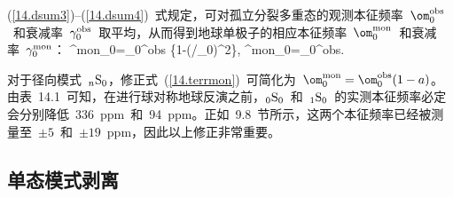 \fi
(\ref{14.dsum3})--(\ref{14.dsum4})~式规定，可对孤立分裂多重态的观测本征频率~$\om^{\rm obs}_0$~和衰减率~$\gamma^{\rm obs}_0$~取平均，从而得到地球单极子的相应本征频率~$\om^{\rm mon}_0$~和衰减率~$\gamma^{\rm mon}_0$：
%
\eq \label{14.terrmon}
\om^{\rm mon}_0=\om_0^{\rm obs}\hspace{-0.2 mm}
\big\{1-
\!(\Omega/\om_0)^2\big\},
\en
\eq
\gamma^{\rm mon}_0=\gamma_0^{\rm obs}.
\en

对于径向模式~${}_n{\rm S}_0$，修正式~(\ref{14.terrmon})~可简化为~$\om^{\rm mon}_0=\om_0^{\rm obs}(1-a)$。由表~14.1~可知，在进行球对称地球反演之前，${}_0{\rm S}_0$~和~${}_1{\rm S}_0$~的实测本征频率必定会分别降低~336~ppm~和~94~ppm。正如~9.8~节所示，这两个本征频率已经被测量至~$\pm 5$~和~$\pm 19$~ppm，因此以上修正非常重要。

\subsection{单态模式剥离}
%
%

